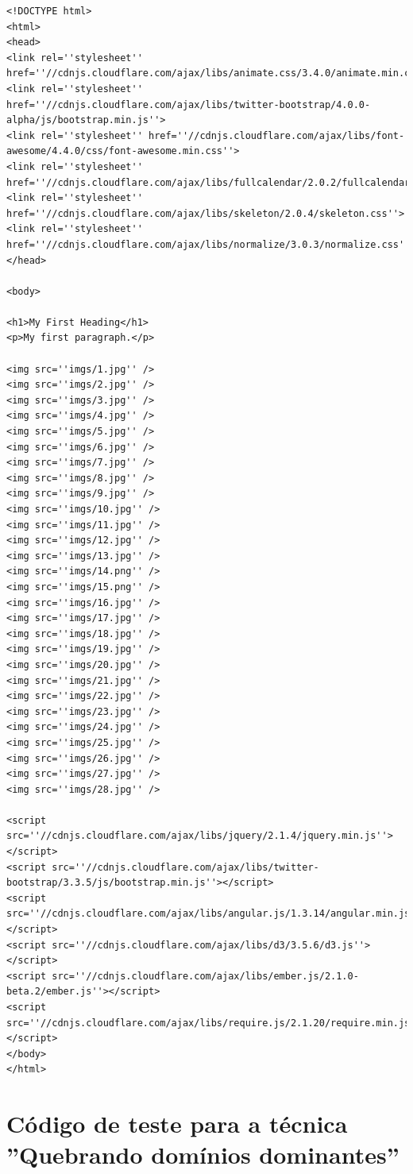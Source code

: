 \begin{apendicesenv}
\begin{lstlisting}
<!DOCTYPE html>
<html>
<head>
<link rel=''stylesheet'' href=''//cdnjs.cloudflare.com/ajax/libs/animate.css/3.4.0/animate.min.css''>
<link rel=''stylesheet'' href=''//cdnjs.cloudflare.com/ajax/libs/twitter-bootstrap/4.0.0-alpha/js/bootstrap.min.js''>
<link rel=''stylesheet'' href=''//cdnjs.cloudflare.com/ajax/libs/font-awesome/4.4.0/css/font-awesome.min.css''>	
<link rel=''stylesheet'' href=''//cdnjs.cloudflare.com/ajax/libs/fullcalendar/2.0.2/fullcalendar.js''>
<link rel=''stylesheet'' href=''//cdnjs.cloudflare.com/ajax/libs/skeleton/2.0.4/skeleton.css''>
<link rel=''stylesheet'' href=''//cdnjs.cloudflare.com/ajax/libs/normalize/3.0.3/normalize.css''>
</head>

<body>

<h1>My First Heading</h1>
<p>My first paragraph.</p>

<img src=''imgs/1.jpg'' />
<img src=''imgs/2.jpg'' />
<img src=''imgs/3.jpg'' />
<img src=''imgs/4.jpg'' />
<img src=''imgs/5.jpg'' />
<img src=''imgs/6.jpg'' />
<img src=''imgs/7.jpg'' />
<img src=''imgs/8.jpg'' />
<img src=''imgs/9.jpg'' />
<img src=''imgs/10.jpg'' />
<img src=''imgs/11.jpg'' />
<img src=''imgs/12.jpg'' />
<img src=''imgs/13.jpg'' />
<img src=''imgs/14.png'' />
<img src=''imgs/15.png'' />
<img src=''imgs/16.jpg'' />
<img src=''imgs/17.jpg'' />
<img src=''imgs/18.jpg'' />
<img src=''imgs/19.jpg'' />
<img src=''imgs/20.jpg'' />
<img src=''imgs/21.jpg'' />
<img src=''imgs/22.jpg'' />
<img src=''imgs/23.jpg'' />
<img src=''imgs/24.jpg'' />
<img src=''imgs/25.jpg'' />
<img src=''imgs/26.jpg'' />
<img src=''imgs/27.jpg'' />
<img src=''imgs/28.jpg'' />

<script src=''//cdnjs.cloudflare.com/ajax/libs/jquery/2.1.4/jquery.min.js''></script>
<script src=''//cdnjs.cloudflare.com/ajax/libs/twitter-bootstrap/3.3.5/js/bootstrap.min.js''></script>
<script src=''//cdnjs.cloudflare.com/ajax/libs/angular.js/1.3.14/angular.min.js''></script>
<script src=''//cdnjs.cloudflare.com/ajax/libs/d3/3.5.6/d3.js''></script>
<script src=''//cdnjs.cloudflare.com/ajax/libs/ember.js/2.1.0-beta.2/ember.js''></script>
<script src=''//cdnjs.cloudflare.com/ajax/libs/require.js/2.1.20/require.min.js''></script>	
</body>
</html>

\end{lstlisting}

\chapter{Código de teste para a técnica ''Quebrando domínios dominantes''}
\label{apend:quebrandodominiodominantes}


\end{apendicesenv}
